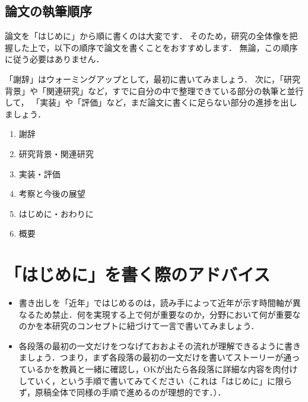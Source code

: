 \subsection{論文の執筆順序}
論文を「はじめに」から順に書くのは大変です．
そのため，研究の全体像を把握した上で，以下の順序で論文を書くことをおすすめします．
無論，この順序に従う必要はありません．

「謝辞」はウォーミングアップとして，最初に書いてみましょう．
次に，「研究背景」や「関連研究」など，すでに自分の中で整理できている部分の執筆と並行して，
「実装」や「評価」など，まだ論文に書くに足らない部分の進捗を出しましょう．

\begin{enumerate}
    \item 謝辞
    \item 研究背景・関連研究
    \item 実装・評価
    \item 考察と今後の展望
    \item はじめに・おわりに
    \item 概要
\end{enumerate}

\section{「はじめに」を書く際のアドバイス}
\begin{itemize}
    \item 書き出しを「近年」ではじめるのは，読み手によって近年が示す時間軸が異なるため禁止．何を実現する上で何が重要なのか，分野において何が重要なのかを本研究のコンセプトに紐づけて一言で書いてみましょう．
    \item 各段落の最初の一文だけをつなげておおよその流れが理解できるように書きましょう．つまり，まず各段落の最初の一文だけを書いてストーリーが通っているかを教員と一緒に確認し，OKが出たら各段落に詳細な内容を肉付けしていく，という手順で書いてみてください（これは「はじめに」に限らず，原稿全体で同様の手順で進めるのが理想的です．）．
\end{itemize}